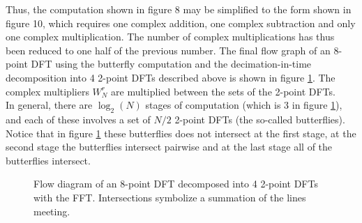Thus, the computation shown in figure 8 may be simplified to the form shown in figure 10, which requires one complex addition, one complex subtraction and only one complex multiplication. The number of complex multiplications has thus been reduced to one half of the previous number. The final flow graph of an 8-point DFT using the butterfly computation and the decimation-in-time decomposition into 4 2-point DFTs described above is shown in figure \ref{fig:fft_flow}. The complex multipliers $W_N^r$ are multiplied between the sets of the 2-point DFTs.
\\
In general, there are $\log_2(N)$ stages of computation (which is 3 in figure \ref{fig:fft_flow}), and each of these involves a set of $N/2$ 2-point DFTs (the so-called butterflies). Notice that in figure \ref{fig:fft_flow} these butterflies does not intersect at the first stage, at the second stage the butterflies intersect pairwise and at the last stage all of the butterflies intersect.
\begin{figure}[H]
\centering
{}
\caption{Flow diagram of an 8-point DFT decomposed into 4 2-point DFTs with the FFT. Intersections symbolize a summation of the lines meeting.}
\label{fig:fft_flow}
\end{figure}


















